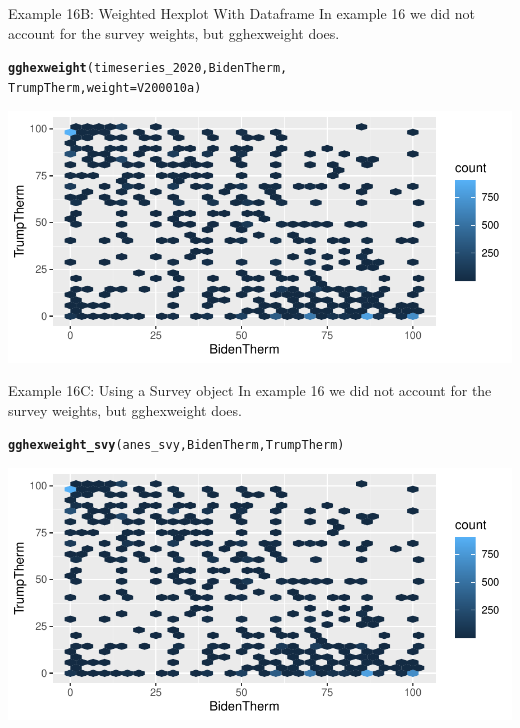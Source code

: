 \documentclass{beamer}\usepackage[]{graphicx}\usepackage[]{color}
\makeatletter
\newcommand{\hlstd}[1]{\textcolor[rgb]{0.345,0.345,0.345}{#1}}%
\newcommand{\hlkwc}[1]{\textcolor[rgb]{0.333,0.667,0.333}{#1}}%
\newcommand{\hlkwd}[1]{\textcolor[rgb]{0.737,0.353,0.396}{\textbf{#1}}}%
\newenvironment{kframe}{%
 \def\at@end@of@kframe{}%
 \ifinner\ifhmode%
  \def\at@end@of@kframe{\end{minipage}}%
  \begin{minipage}{\columnwidth}%
 \fi\fi%
 \def\FrameCommand##1{\hskip\@totalleftmargin \hskip-\fboxsep
 \colorbox{shadecolor}{##1}\hskip-\fboxsep
     \hskip-\linewidth \hskip-\@totalleftmargin \hskip\columnwidth}%
 \MakeFramed {\advance\hsize-\width
   \@totalleftmargin\z@ \linewidth\hsize
   \@setminipage}}%
 {\par\unskip\endMakeFramed%
 \at@end@of@kframe}
\newenvironment{knitrout}{}{} %
\makeatother
\begin{document}
\begin{frame}[fragile]{Example 16B: Weighted Hexplot With Dataframe}
In example 16 we did not account for the survey weights, but gghexweight does.
\begin{knitrout}
\color{fgcolor}\begin{kframe}
\begin{alltt}
\hlkwd{gghexweight}\hlstd{(timeseries_2020, BidenTherm,}
    \hlstd{TrumpTherm,} \hlkwc{weight} \hlstd{= V200010a)}
\end{alltt}
\end{kframe}
\includegraphics[width=0.95\linewidth]{figure/unnamed-chunk-63-1} 
\end{knitrout}

\end{frame}



\begin{frame}[fragile]{Example 16C: Using a Survey object}
In example 16 we did not account for the survey weights, but gghexweight does.
\begin{knitrout}
\color{fgcolor}\begin{kframe}
\begin{alltt}
\hlkwd{gghexweight_svy}\hlstd{(anes_svy, BidenTherm, TrumpTherm)}
\end{alltt}
\end{kframe}
\includegraphics[width=0.95\linewidth]{figure/unnamed-chunk-64-1} 
\end{knitrout}

\end{frame}
\end{document}
